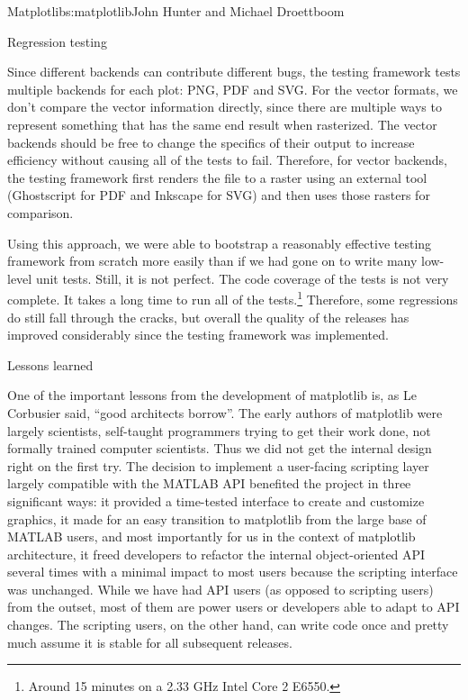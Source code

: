 \begin{aosachapter}{Matplotlib}{s:matplotlib}{John Hunter and Michael Droettboom}
\begin{aosasect1}{Regression testing}

Since different backends can contribute different bugs, the testing
framework tests multiple backends for each plot: PNG, PDF and SVG.
For the vector formats, we don't compare the vector information
directly, since there are multiple ways to represent something that
has the same end result when rasterized.  The vector backends should
be free to change the specifics of their output to increase efficiency
without causing all of the tests to fail.  Therefore, for vector
backends, the testing framework first renders the file to a raster
using an external tool (Ghostscript for PDF and Inkscape for SVG) and
then uses those rasters for comparison.

Using this approach, we were able to bootstrap a reasonably effective
testing framework from scratch more easily than if we had gone on to
write many low-level unit tests.  Still, it is not perfect.  The code
coverage of the tests is not very complete.  It takes a long time to
run all of the tests.\footnote{Around 15 minutes on a 2.33 GHz Intel
  Core 2 E6550.}  Therefore, some regressions do still fall through
the cracks, but overall the quality of the releases has improved
considerably since the testing framework was implemented.

\end{aosasect1}

\begin{aosasect1}{Lessons learned}

One of the important lessons from the development of matplotlib is,
as Le Corbusier said, ``good architects borrow''.  The early authors
of matplotlib were largely scientists, self-taught programmers
trying to get their work done, not formally trained computer
scientists.  Thus we did not get the internal design right on the
first try.  The decision to implement a user-facing scripting layer
largely compatible with the MATLAB API benefited the project in
three significant ways: it provided a time-tested interface to
create and customize graphics, it made for an easy transition to
matplotlib from the large base of MATLAB users, and most importantly
for us in the context of matplotlib architecture, it freed
developers to refactor the internal object-oriented API several
times with a minimal impact to most users because the scripting
interface was unchanged.  While we have had API users (as opposed to
scripting users) from the outset, most of them are power users or
developers able to adapt to API changes.  The scripting users, on
the other hand, can write code once and pretty much assume it is
stable for all subsequent releases.


\end{aosasect1}
\end{aosachapter}
